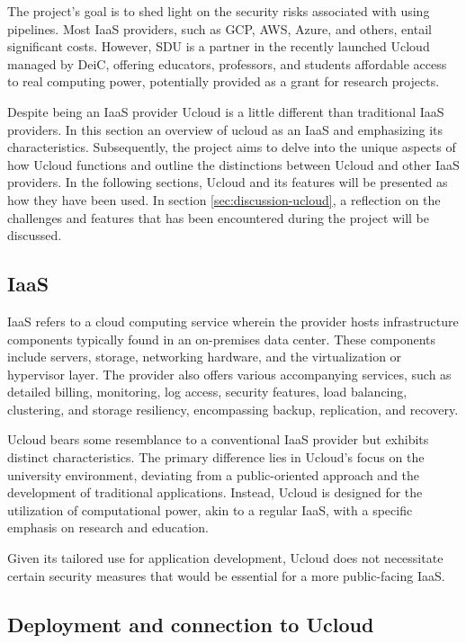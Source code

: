 The project's goal is to shed light on the security risks associated with using pipelines. 
Most \ac{IaaS} providers, such as \ac{GCP}, \ac{AWS}, \ac{Azure}, and others, entail significant costs. 
However, \ac{SDU} is a partner in the recently launched \ac{Ucloud} managed by \ac{DeiC}\cite{deic}, offering educators, professors, 
and students affordable access to real computing power, potentially provided as a grant for research projects.

Despite being an \ac{IaaS} provider \ac{Ucloud} is a little different than traditional 
IaaS providers.
In this section an overview of ucloud as an \ac{IaaS} and emphasizing its characteristics. 
Subsequently, the project aims to delve into the unique aspects of how \ac{Ucloud} functions and outline the distinctions 
between \ac{Ucloud} and other \ac{IaaS} providers. In the following sections, \ac{Ucloud} and its features will be presented as 
how they have been used. In section \ref{sec:discussion-ucloud}, a reflection on the challenges and features that
has been encountered during the project will be discussed.

\subsection{\ac{IaaS}}
\label{sec:iaas}
\ac{IaaS} refers to a cloud computing service wherein the provider hosts 
infrastructure components typically found in an on-premises data center. 
These components include servers, storage, networking hardware, and the virtualization or hypervisor layer. 
The provider also offers various accompanying services, such as detailed billing, monitoring, log access, security features,
load balancing, clustering, and storage resiliency, encompassing backup, replication, and recovery\cite{iaas}.

\ac{Ucloud} bears some resemblance to a conventional \ac{IaaS} provider but exhibits distinct characteristics. 
The primary difference lies in \ac{Ucloud}'s focus on the university environment, 
deviating from a public-oriented approach and the development of traditional applications. 
Instead, \ac{Ucloud} is designed for the utilization of computational power, akin to a regular \ac{IaaS}, 
with a specific emphasis on research and education.

Given its tailored use for application development, 
\ac{Ucloud} does not necessitate certain security measures that would be essential for a more public-facing \ac{IaaS}.

\subsection{Deployment and connection to \ac{Ucloud}}
\label{sec:deployment-and-connetion-ucloud}
